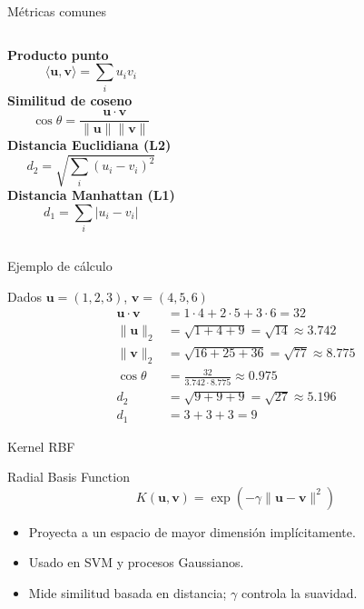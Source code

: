 \documentclass[aspectratio=169, 10pt, xcolor=table]{beamer}
\begin{document}
\begin{frame}{Métricas comunes}
    \begin{columns}[t]
        \textbf{Producto punto}
        \[
        \langle \mathbf{u},\mathbf{v}\rangle = \sum_i u_i v_i
        \]
        \textbf{Similitud de coseno}
        \[
        \cos\theta = \frac{\mathbf{u}\cdot\mathbf{v}}{\|\mathbf{u}\|\|\mathbf{v}\|}
        \]
        \textbf{Distancia Euclidiana (L2)}
        \[
        d_2 = \sqrt{\sum_i (u_i-v_i)^2}
        \]
        \textbf{Distancia Manhattan (L1)}
        \[
        d_1 = \sum_i |u_i-v_i|
        \]
    \end{columns}
\end{frame}

\begin{frame}{Ejemplo de cálculo}
    \begin{exampleblock}
        {Dados $\mathbf{u}=(1,2,3)$, $\mathbf{v}=(4,5,6)$}
        \begin{align*}
            \mathbf{u}\cdot\mathbf{v} &= 1\cdot4+2\cdot5+3\cdot6 = 32 \\
            \|\mathbf{u}\|_2 &= \sqrt{1+4+9}=\sqrt{14}\approx3.742 \\
            \|\mathbf{v}\|_2 &= \sqrt{16+25+36}=\sqrt{77}\approx8.775 \\
            \cos\theta &= \frac{32}{3.742\cdot8.775}\approx0.975 \\
            d_2 &= \sqrt{9+9+9}=\sqrt{27}\approx5.196 \\
            d_1 &= 3+3+3 = 9
        \end{align*}
    \end{exampleblock}
\end{frame}

\begin{frame}{Kernel RBF}
    \begin{block}{Radial Basis Function}
        \[
        K(\mathbf{u},\mathbf{v}) = \exp\left(-\gamma \|\mathbf{u}-\mathbf{v}\|^2\right)
        \]
    \end{block}
    \begin{itemize}
        \item Proyecta a un espacio de mayor dimensión implícitamente.
        \item Usado en SVM y procesos Gaussianos.
        \item Mide similitud basada en distancia; $\gamma$ controla la suavidad.
    \end{itemize}
\end{frame}
\end{document}
